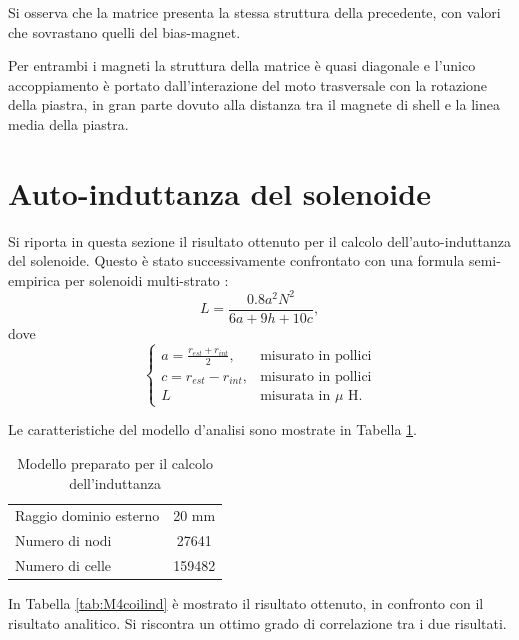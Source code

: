 Si osserva che la matrice presenta la stessa struttura della precedente, con valori che sovrastano quelli del bias-magnet. 

Per entrambi i magneti la struttura della matrice è quasi diagonale e l'unico accoppiamento è portato dall'interazione del moto trasversale con la rotazione della piastra, in gran parte dovuto alla distanza tra il magnete di shell e la linea media della piastra.

\section{Auto-induttanza del solenoide}
Si riporta in questa sezione il risultato ottenuto per il calcolo dell'auto-induttanza del solenoide. Questo è stato successivamente confrontato con una formula semi-empirica per solenoidi multi-strato \citep{lee_integrated_2009}:\\
\begin{equation}
\label{eq:6wheeler2}
L = \frac{0.8 a^2N^2}{6a+9h+10c},
\end{equation}
dove
\begin{equation}
\label{eq:6wheeler3}
\left\{ \begin{array}{ll}
a = \frac{r_{est}+r_{int}}{2},&\text{misurato in pollici}\\
c = r_{est}-r_{int}, & \text{misurato in pollici}\\
L & \text{misurata in $\mu$ H}.\end{array}\right.
\end{equation}

Le caratteristiche del modello d'analisi sono mostrate in Tabella \ref{tab:M4coildatabis}.

\begin{table}
\centering
\caption{Modello preparato per il calcolo dell'induttanza}
\label{tab:M4coildatabis}
\begin{tabular}{lc}
\toprule
Raggio dominio esterno & 20 mm\\
Numero di nodi &  27641\\
Numero di celle & 159482\\
\bottomrule
\end{tabular}
\end{table}

In Tabella \ref{tab:M4coilind} è mostrato il risultato ottenuto, in confronto con il risultato analitico. Si riscontra un ottimo grado di correlazione tra i due risultati.




